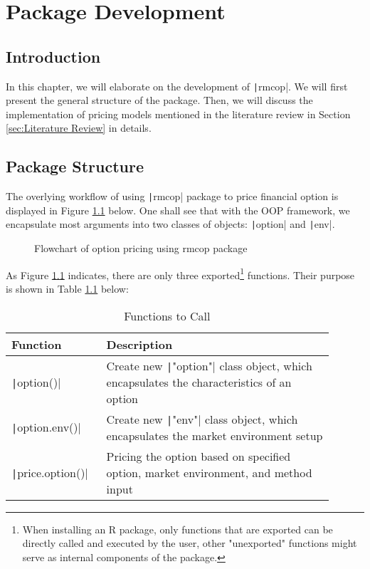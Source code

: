 \chapter{Package Development} \label{cpt:Pkg Dev}

\section{Introduction}

In this chapter, we will elaborate on the development of \texttt|rmcop|. We will first present the general structure of the package. Then, we will discuss the implementation of pricing models mentioned in the literature review in Section \ref{sec:Literature Review} in details.

\section{Package Structure} \label{sec:Pkg Structure}

The overlying workflow of using \texttt|rmcop| package to price financial option is displayed in Figure \ref{img:flowchart_option} below. One shall see that with the OOP framework, we encapsulate most arguments into two classes of objects: \texttt|option| and \texttt|env|.

\begin{figure}[H]
    \centering
    
    \caption{Flowchart of option pricing using rmcop package} \label{img:flowchart_option}
\end{figure}

As Figure \ref{img:flowchart_option} indicates, there are only three exported\footnote{When installing an R package, only functions that are exported can be directly called and executed by the user, other "unexported" functions might serve as internal components of the package.} functions. Their purpose is shown in Table \ref{tab:pkg_functions} below:

\begin{table}[H]
    \begin{tabular}{p{0.25\linewidth} | p{0.65\linewidth}}
    Function                            & Description \\ \hline
    \texttt|option()|            & Create new \texttt|"option"| class object, which encapsulates the characteristics of an option \\
    \texttt|option.env()|        & Create new \texttt|"env"| class object, which encapsulates the market environment setup \\
    \texttt|price.option()|      & Pricing the option based on specified option, market environment, and method input                       
    \end{tabular}
    \caption{Functions to Call} \label{tab:pkg_functions}
\end{table}
    
